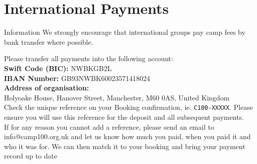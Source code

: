 \documentclass[a4paper, 11pt]{report}
\begin{document}
\chapter{International Payments}

\begin{callout-green}{Information}
We strongly encourage that international groups pay camp fees by bank transfer where possible. 
\end{callout-green}

Please transfer all payments into the following account:\\
\textbf{Swift Code (BIC):} NWBKGB2L\\
\textbf{IBAN Number:} GB93NWBK60023571418024\\
\textbf{Address of organisation:} \\
Holyoake House, Hanover Street, Manchester, M60 0AS, United Kingdom\\

Check the unique reference on your Booking confirmation, ie. \verb|C100-XXXXX|. Please ensure you will use this reference for the deposit and all subsequent payments. \\

If for any reason you cannot add a reference, please send an email to info@camp100.org.uk and let us know how much you paid, when you paid it and who it was for. We can then match it to your booking and bring your payment record up to date

\makedocumentbackpage
\end{document}
